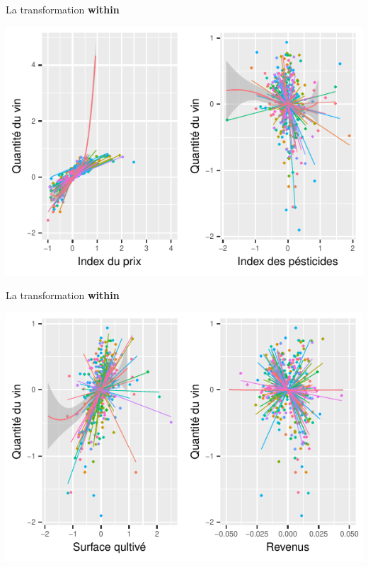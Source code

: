 \documentclass[11pt,ignorenonframetext,]{beamer}
\begin{document}
\begin{frame}{La transformation \textbf{within}}
\protect\hypertarget{la-transformation-within}{}

\tiny

\begin{center}\includegraphics{Presentation_files/figure-beamer/unnamed-chunk-29-1} \end{center}

\normalsize

\end{frame}

\begin{frame}{La transformation \textbf{within}}
\protect\hypertarget{la-transformation-within-1}{}

\tiny

\begin{center}\includegraphics{Presentation_files/figure-beamer/unnamed-chunk-30-1} \end{center}

\normalsize

\end{frame}
\end{document}
